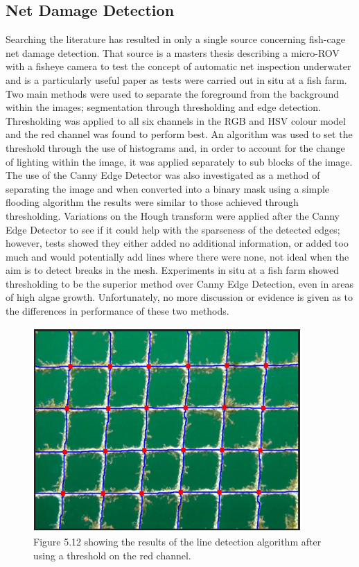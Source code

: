 \documentclass[11.5pt, twoside, a4paper]{article}
\begin{document}
\subsection{Net Damage Detection}

Searching the literature has resulted in only a single source \cite{jakobsen2011automatic} concerning fish-cage net damage detection. That source is a masters thesis describing a micro-ROV with a fisheye camera to test the concept of automatic net inspection underwater and is a particularly useful paper as tests were carried out in situ at a fish farm. Two main methods were used to separate the foreground from the background within the images; segmentation through thresholding and edge detection. Thresholding was applied to all six channels in the RGB and HSV colour model and the red channel was found to perform best. An algorithm was used to set the threshold through the use of histograms and, in order to account for the change of lighting within the image, it was applied separately to sub blocks of the image. The use of the Canny Edge Detector was also investigated as a method of separating the image and when converted into a binary mask using a simple flooding algorithm the results were similar to those achieved through thresholding. Variations on the Hough transform were applied after the Canny Edge Detector to see if it could help with the sparseness of the detected edges; however, tests showed they either added no additional information, or added too much and would potentially add lines where there were none, not ideal when the aim is to detect breaks in the mesh. Experiments in situ at a fish farm showed thresholding to be the superior method over Canny Edge Detection, even in areas of high algae growth. Unfortunately, no more discussion or evidence is given as to the differences in performance of these two methods.  

\begin{figure}
\begin{center}
\includegraphics{Lines.png}
\caption{Figure 5.12 showing the results of the line detection algorithm after using a threshold on the red channel. \cite{jakobsen2011automatic} \label{fig:lines}}
\end{center}
\end{figure}
\end{document}
